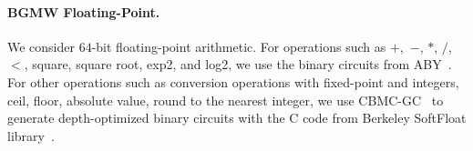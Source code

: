 
\paragraph{BGMW Floating-Point.}
We consider $64$-bit floating-point arithmetic. For operations such as $+,$ $-$, $*$, $/$, $<$, square, square root, exp2, and log2, we use the binary circuits from ABY~\cite{demmler2015aby}. For other operations such as conversion operations with \booleanGMW fixed-point and \booleanGMW integers, ceil, floor, absolute value, round to the nearest integer, we use CBMC-GC~\cite{buscher2016compiling} to generate depth-optimized binary circuits with the C code from Berkeley SoftFloat library~\cite{BerkelySoftFloat}.

